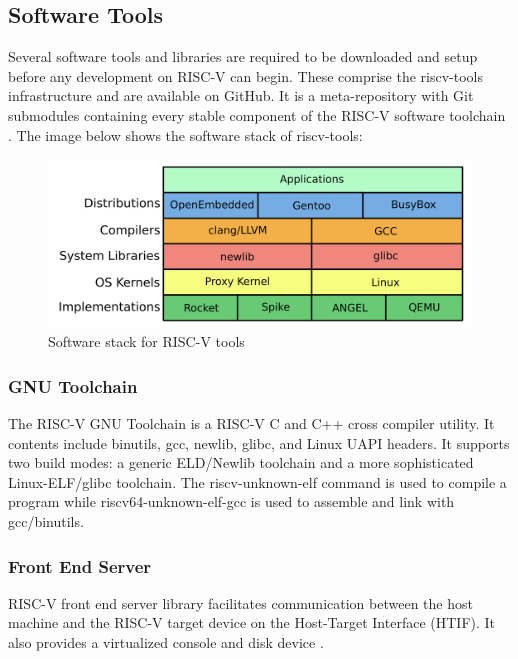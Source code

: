 \subsection{Software Tools}
 \label{sect6_2_1}
Several software tools and libraries are required to be downloaded and setup before any development on RISC-V can begin. These comprise the riscv-tools infrastructure and are available on GitHub. It is a meta-repository with Git submodules containing every stable component of the RISC-V software toolchain \cite{riscv_tools_bootcamp}. The image below shows the software stack of riscv-tools: \newline\newline
\begin{figure}[h!]
\includegraphics[width=\linewidth]{figures/RISC-V_Software_Stack.png}
\caption{Software stack for RISC-V tools \cite{riscv_tools_bootcamp}}
\label{fig:riscv2}
\end{figure}

\subsubsection{GNU Toolchain}
 \label{sect6_2_1_1}
The RISC-V GNU Toolchain is a RISC-V C and C++ cross compiler utility. It contents include binutils, gcc, newlib, glibc, and Linux UAPI headers. It supports two build modes: a generic ELD/Newlib toolchain and a more sophisticated Linux-ELF/glibc toolchain. The riscv-unknown-elf command is used to compile a program while riscv64-unknown-elf-gcc is used to assemble and link with gcc/binutils.

\subsubsection{Front End Server}
 \label{sect6_2_1_2}
RISC-V front end server library facilitates communication between the host machine and the RISC-V target device on the Host-Target Interface (HTIF). It also provides a virtualized console and disk device \cite{riscv_soft_tools}. 


